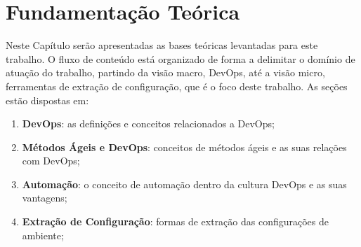 \newpage\null\thispagestyle{empty}\newpage
\chapter{Fundamentação Teórica}
\label{chap:teoria}

Neste Capítulo serão apresentadas as bases teóricas levantadas para este trabalho.
O fluxo de conteúdo está organizado de forma a delimitar o domínio de atuação
do trabalho, partindo da visão macro, DevOps, até a visão micro, ferramentas de
extração de configuração, que é o foco deste trabalho. As seções estão dispostas em:

\begin{enumerate}
  \item \textbf{DevOps}: as definições e conceitos relacionados a DevOps;
  \item \textbf{Métodos Ágeis e DevOps}: conceitos de métodos ágeis e as 
suas relações com DevOps;
  \item \textbf{Automação}: o conceito de automação dentro da cultura DevOps e as suas vantagens;
  \item \textbf{Extração de Configuração}: formas de extração das configurações de ambiente;
\end{enumerate}





